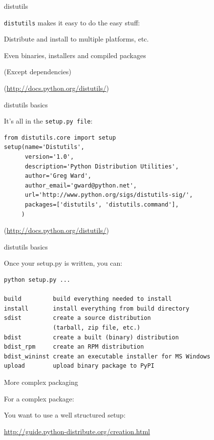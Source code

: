 \documentclass{beamer}
\begin{document}
\begin{frame}[fragile]{distutils}

\vfill
{\LARGE \verb|distutils| makes it easy to do the easy stuff:}

\vfill
{\Large Distribute and install to multiple platforms, etc.}

\vfill
{\Large Even binaries, installers and compiled packages}

\vfill
{\Large (Except dependencies)}

\vfill
(\url{http://docs.python.org/distutils/})
\end{frame} 

\begin{frame}[fragile]{distutils basics}

\vfill
{\Large It's all in the \verb|setup.py file|:}

\begin{verbatim}
from distutils.core import setup
setup(name='Distutils',
      version='1.0',
      description='Python Distribution Utilities',
      author='Greg Ward',
      author_email='gward@python.net',
      url='http://www.python.org/sigs/distutils-sig/',
      packages=['distutils', 'distutils.command'],
     )
\end{verbatim}
\vfill
(\url{http://docs.python.org/distutils/})
\end{frame} 

\begin{frame}[fragile]{distutils basics}

{\Large Once your setup.py is written, you can:}

\begin{verbatim}
python setup.py ...

build         build everything needed to install
install       install everything from build directory
sdist         create a source distribution
              (tarball, zip file, etc.)
bdist         create a built (binary) distribution
bdist_rpm     create an RPM distribution
bdist_wininst create an executable installer for MS Windows
upload        upload binary package to PyPI
\end{verbatim}

\end{frame} 

\begin{frame}[fragile]{More complex packaging}

{\Large For a complex package:}

\vfill
{\Large You want to use a well structured setup:}

\vfill
\url{http://guide.python-distribute.org/creation.html}
\vfill
\end{frame} 
\end{document}
